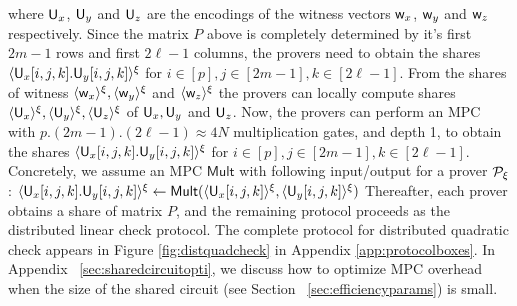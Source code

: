 where $\mathsf{U}_x$, $\mathsf{U}_y$ and $\mathsf{U}_z$ are the encodings of the witness
vectors $\mathsf{w}_x$, $\mathsf{w}_y$ and $\mathsf{w}_z$ respectively. 
Since the matrix $P$ above is completely determined by it's first $2m-1$ rows
and first $2\ell-1$ columns, the provers need to obtain the shares
$\langle{\mathsf{U}_x[i,j,k].\mathsf{U}_y[i,j,k]}\rangle^\xi$ for $i\in [p],j\in [2m-1],k\in [2\ell-1]$.
From the shares of witness $\langle{\mathsf{w}_x}\rangle^\xi,\langle{\mathsf{w}_y}\rangle^\xi$ and $\langle{\mathsf{w}_z}\rangle^\xi$ the
provers can locally compute shares $\langle{\mathsf{U}_x}\rangle^\xi,\langle{\mathsf{U}_y}\rangle^\xi,\langle{\mathsf{U}_z}\rangle^\xi$
of $\mathsf{U}_x,\mathsf{U}_y$ and $\mathsf{U}_z$. Now, the provers can perform an MPC with
$p.(2m-1).(2\ell-1)\approx 4N$ multiplication gates, and depth 1, to obtain the
shares $\langle{\mathsf{U}_x[i,j,k].\mathsf{U}_y[i,j,k]}\rangle^\xi$ for $i\in [p],j\in [2m-1],k\in [2\ell-1]$.
Concretely, we assume an MPC $\mathsf{Mult}$ with following input/output for
a prover $\mathcal{P}_\xi$:     
$\langle{\mathsf{U}_x[i,j,k].\mathsf{U}_y[i,j,k]}\rangle^\xi\leftarrow
\mathsf{Mult}(\langle{\mathsf{U}_x[i,j,k]}\rangle^\xi,\langle{\mathsf{U}_y[i,j,k]}\rangle^\xi)$    
Thereafter, each prover obtains a share of matrix $P$, and the remaining protocol proceeds as
the distributed linear check protocol. 
The complete protocol for
distributed quadratic check appears in Figure \ref{fig:distquadcheck} in
Appendix \ref{app:protocolboxes}. In Appendix ~\ref{sec:sharedcircuitopti}, we
discuss how to optimize MPC overhead when the size of the shared circuit (see 
 Section ~\ref{sec:efficiencyparams}) is small.


